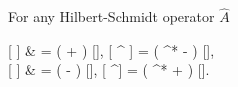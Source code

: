 \begin{theorem}
\label{thm:wigner:func:correspondences}
	For any Hilbert-Schmidt operator $\hat{A}$
	\begin{eqn*}
		 [ \Psiop {} ]
			& = \left( \Psi +  \frac{\fdelta}{\fdelta \Psi^*} \right) ,
		\quad
		 [ \Psiop^\dagger {} ]
			= \left( \Psi^* -  \frac{\fdelta}{\fdelta \Psi} \right) , \\
		 [  \Psiop ]
			& = \left( \Psi -  \frac{\fdelta}{\fdelta \Psi^*} \right) ,
		\quad
		 [  \Psiop^\dagger ]
			= \left( \Psi^* +  \frac{\fdelta}{\fdelta \Psi} \right) .
	\end{eqn*}
\end{theorem}
